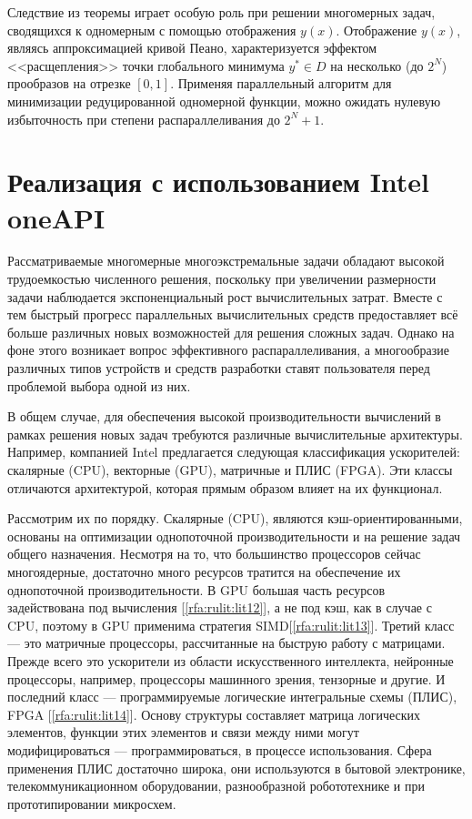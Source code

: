 \documentclass[10pt,a4paper]{book}
\begin{document}
Следствие из теоремы играет особую роль при решении многомерных задач, сводящихся к одномерным с помощью отображения $y(x)$. Отображение $y(x)$, являясь аппроксимацией кривой Пеано, характеризуется эффектом <<расщепления>> точки глобального минимума $y^* \in D$ на несколько (до $2^N$) прообразов на отрезке $[0,1]$. Применяя параллельный алгоритм для минимизации редуцированной одномерной функции, можно ожидать нулевую избыточность при степени распараллеливания до $2^N+1$.


\section{Реализация с использованием Intel oneAPI}


Рассматриваемые многомерные многоэкстремальные задачи обладают высокой трудоемкостью численного решения, поскольку при увеличении размерности задачи наблюдается экспоненциальный рост вычислительных затрат. Вместе с тем быстрый прогресс параллельных вычислительных средств предоставляет всё больше различных новых возможностей для решения сложных задач. Однако на фоне этого возникает вопрос эффективного распараллеливания, а многообразие различных типов устройств и средств разработки ставят пользователя перед проблемой выбора одной из них.

В общем случае, для обеспечения высокой производительности вычислений в рамках решения новых задач требуются различные вычислительные архитектуры. Например, компанией Intel предлагается следующая классификация ускорителей: скалярные (CPU), векторные (GPU), матричные и ПЛИС (FPGA). Эти классы отличаются архитектурой, которая прямым образом влияет на их функционал.
 
Рассмотрим их по порядку. Скалярные (CPU), являются кэш-ориентированными, основаны на оптимизации однопоточной производительности и на решение задач общего назначения. Несмотря на то, что большинство процессоров сейчас многоядерные, достаточно много ресурсов тратится на обеспечение их однопоточной производительности. В GPU большая часть ресурсов задействована под вычисления [\ref{rfa:rulit:lit12}], а не под кэш, как в случае с CPU, поэтому в GPU применима стратегия SIMD[\ref{rfa:rulit:lit13}].   Третий класс --- это матричные процессоры, рассчитанные на быструю работу с матрицами. Прежде всего это ускорители из области искусственного интеллекта, нейронные процессоры, например, процессоры машинного зрения, тензорные и другие. И последний класс --- программируемые логические интегральные схемы (ПЛИС), FPGA [\ref{rfa:rulit:lit14}]. Основу структуры составляет матрица логических элементов, функции этих элементов и связи между ними могут модифицироваться --- программироваться, в процессе использования. Сфера применения ПЛИС достаточно широка, они используются в бытовой электронике, телекоммуникационном оборудовании, разнообразной робототехнике и при прототипировании микросхем.
\end{document}
